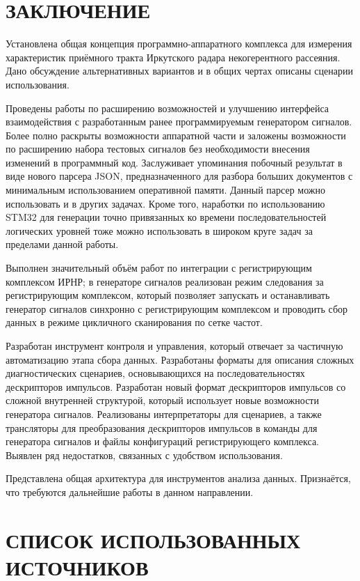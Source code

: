 \documentclass{report}
\begin{document}
\chapter*{ЗАКЛЮЧЕНИЕ}

Установлена общая концепция программно-аппаратного комплекса для измерения характеристик приёмного тракта Иркутского радара некогерентного рассеяния. Дано обсуждение альтернативных вариантов и в общих чертах описаны сценарии использования.

Проведены работы по расширению возможностей и улучшению интерфейса взаимодействия с разработанным ранее программируемым генератором сигналов. Более полно раскрыты возможности аппаратной части и заложены возможности по расширению набора тестовых сигналов без необходимости внесения изменений в программный код. Заслуживает упоминания побочный результат в виде нового парсера JSON, предназначенного для разбора больших документов с минимальным использованием оперативной памяти. Данный парсер можно использовать и в других задачах. Кроме того, наработки по использованию STM32 для генерации точно привязанных ко времени последовательностей логических уровней тоже можно использовать в широком круге задач за пределами данной работы.

Выполнен значительный объём работ по интеграции с регистрирующим комплексом ИРНР; в генераторе сигналов реализован режим следования за регистрирующим комплексом, который позволяет запускать и останавливать генератор сигналов синхронно с регистрирующим комплексом и проводить сбор данных в режиме цикличного сканирования по сетке частот.

Разработан инструмент контроля и управления, который отвечает за частичную автоматизацию этапа сбора данных. Разработаны форматы для описания сложных диагностических сценариев, основывающихся на последовательностях дескрипторов импульсов. Разработан новый формат дескрипторов импульсов со сложной внутренней структурой, который использует новые возможности генератора сигналов. Реализованы интерпретаторы для сценариев, а также трансляторы для преобразования дескрипторов импульсов в команды для генератора сигналов и файлы конфигураций регистрирующего комплекса. Выявлен ряд недостатков, связанных с удобством использования.

Представлена общая архитектура для инструментов анализа данных. Признаётся, что требуются дальнейшие работы в данном направлении.

\chapter*{СПИСОК ИСПОЛЬЗОВАННЫХ ИСТОЧНИКОВ}
\end{document}
